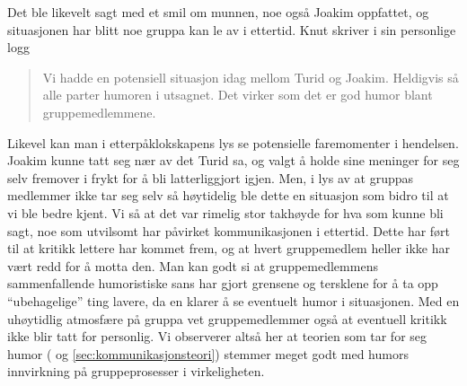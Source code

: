 Det ble likevelt sagt med et smil om munnen, noe også Joakim oppfattet, og
situasjonen har blitt noe gruppa kan le av i ettertid. 
Knut skriver i sin personlige
logg 
\begin{quote}
Vi hadde en potensiell situasjon idag mellom Turid og Joakim. Heldigvis
så alle parter humoren i utsagnet. Det virker som det er god humor blant
gruppemedlemmene.
\end{quote}

Likevel kan man i etterpåklokskapens lys se potensielle faremomenter
i hendelsen. Joakim kunne tatt seg nær av det Turid sa, og valgt å holde sine
meninger for seg selv fremover i frykt for å bli latterliggjort igjen. Men, i
lys av at gruppas medlemmer ikke tar seg selv så høytidelig ble dette en
situasjon som bidro til at vi ble bedre kjent. Vi så at det var
rimelig stor takhøyde for hva som kunne bli sagt, noe som utvilsomt har påvirket
kommunikasjonen i ettertid. Dette har ført til at kritikk lettere
har kommet frem, og at hvert gruppemedlem heller ikke har vært redd for å motta
den. Man kan godt si at gruppemedlemmens sammenfallende humoristiske sans har
gjort grensene og tersklene for å ta opp ``ubehagelige'' ting lavere, da en klarer å 
se eventuelt humor i situasjonen. Med en uhøytidlig atmosfære på gruppa vet gruppemedlemmer
også at eventuell kritikk ikke blir tatt for personlig. Vi observerer altså her at teorien 
som tar for seg humor (\cite{jj-humor} og \cref{sec:kommunikasjonsteori}) stemmer 
meget godt med humors innvirkning på gruppeprosesser i virkeligheten.



